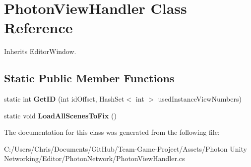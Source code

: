 \hypertarget{class_photon_view_handler}{}\section{Photon\+View\+Handler Class Reference}
\label{class_photon_view_handler}


Inherits Editor\+Window.

\subsection*{Static Public Member Functions}
\begin{DoxyCompactItemize}
\item 
static int {\bfseries Get\+ID} (int id\+Offset, Hash\+Set$<$ int $>$ used\+Instance\+View\+Numbers)\hypertarget{class_photon_view_handler_a0512a521deb73ec443d70288c7ca2604}{}\label{class_photon_view_handler_a0512a521deb73ec443d70288c7ca2604}

\item 
static void {\bfseries Load\+All\+Scenes\+To\+Fix} ()\hypertarget{class_photon_view_handler_a400a040d4ba1ed78aba778080f0c176a}{}\label{class_photon_view_handler_a400a040d4ba1ed78aba778080f0c176a}

\end{DoxyCompactItemize}


The documentation for this class was generated from the following file\+:\begin{DoxyCompactItemize}
\item 
C\+:/\+Users/\+Chris/\+Documents/\+Git\+Hub/\+Team-\/\+Game-\/\+Project/\+Assets/\+Photon Unity Networking/\+Editor/\+Photon\+Network/Photon\+View\+Handler.\+cs\end{DoxyCompactItemize}
